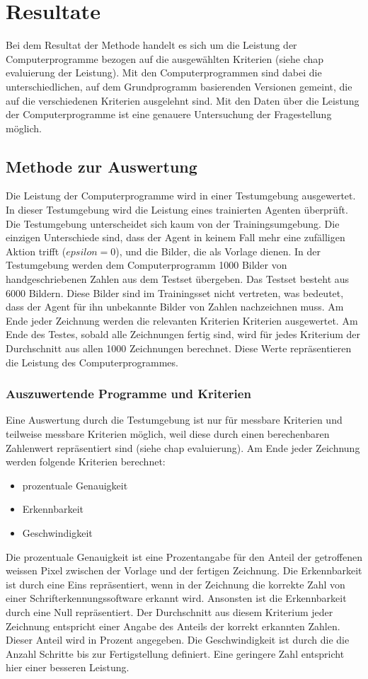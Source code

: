 \chapter{Resultate}
Bei dem Resultat der Methode handelt es sich um die Leistung der
Computerprogramme bezogen auf die ausgewählten Kriterien (siehe chap evaluierung
der Leistung). Mit den Computerprogrammen sind dabei die unterschiedlichen, auf
dem Grundprogramm basierenden Versionen gemeint, die auf die verschiedenen
Kriterien ausgelehnt sind. 
Mit den Daten über die Leistung der Computerprogramme
ist eine genauere Untersuchung der Fragestellung möglich.

\section{Methode zur Auswertung}
Die Leistung der Computerprogramme wird in einer Testumgebung ausgewertet. In
dieser Testumgebung wird die Leistung eines trainierten Agenten überprüft. Die
Testumgebung unterscheidet sich kaum von der Trainingsumgebung. Die einzigen
Unterschiede sind, dass der Agent in keinem Fall mehr eine zufälligen Aktion
trifft ($epsilon = 0$), und die Bilder, die als Vorlage dienen. In der
Testumgebung werden dem Computerprogramm 1000 Bilder von handgeschriebenen
Zahlen aus dem Testset übergeben. Das Testset besteht aus 6000 Bildern. Diese
Bilder sind im Trainingsset nicht vertreten, was bedeutet, dass der Agent für
ihn unbekannte Bilder von Zahlen nachzeichnen muss. Am Ende jeder Zeichnung
werden die relevanten Kriterien Kriterien ausgewertet. Am Ende des Testes,
sobald alle Zeichnungen fertig sind, wird für jedes Kriterium der Durchschnitt
aus allen 1000 Zeichnungen berechnet. Diese Werte repräsentieren die Leistung
des Computerprogrammes.

\subsection*{Auszuwertende Programme und Kriterien}
Eine Auswertung durch die Testumgebung ist nur für messbare Kriterien und
teilweise messbare Kriterien möglich, weil diese durch einen berechenbaren
Zahlenwert repräsentiert sind (siehe chap evaluierung). Am Ende jeder Zeichnung
werden folgende Kriterien berechnet:
\begin{itemize}
    \item prozentuale Genauigkeit
    \item Erkennbarkeit
    \item Geschwindigkeit
\end{itemize}
Die prozentuale Genauigkeit ist eine Prozentangabe für den Anteil der
getroffenen weissen Pixel zwischen der Vorlage und der fertigen Zeichnung. Die
Erkennbarkeit ist durch eine Eins repräsentiert, wenn in der Zeichnung die
korrekte Zahl von einer Schrifterkennungssoftware erkannt wird. Ansonsten ist
die Erkennbarkeit durch eine Null repräsentiert. Der Durchschnitt aus diesem
Kriterium jeder Zeichnung entspricht einer Angabe des Anteils der korrekt
erkannten Zahlen. Dieser Anteil wird in Prozent angegeben. Die Geschwindigkeit
ist durch die die Anzahl Schritte bis zur Fertigstellung definiert. Eine
geringere Zahl entspricht hier einer besseren Leistung.

